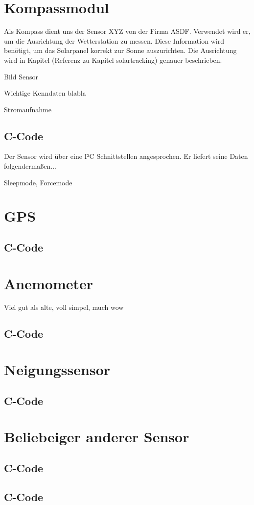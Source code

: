 \section{Kompassmodul}

Als Kompass dient uns der Sensor XYZ von der Firma ASDF. Verwendet wird er, um die Ausrichtung der Wetterstation zu messen. Diese Information wird benötigt, um das Solarpanel korrekt zur Sonne auszurichten. Die Ausrichtung wird in Kapitel (Referenz zu Kapitel solartracking) genauer beschrieben.

Bild Sensor

Wichtige Kenndaten blabla

Stromaufnahme

\subsection{C-Code}

Der Sensor wird über eine I²C Schnittstellen angesprochen. Er liefert seine Daten folgendermaßen...

Sleepmode, Forcemode

\section{GPS}

\subsection{C-Code}

\section{Anemometer}

Viel gut als alte, voll simpel, much wow

\subsection{C-Code}

\section{Neigungssensor}

\subsection{C-Code}

\section{Beliebeiger anderer Sensor}

\subsection{C-Code}

\subsection{C-Code}